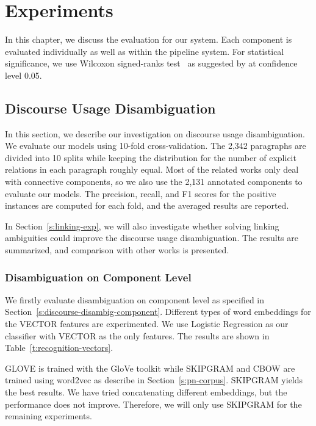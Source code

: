 %
%
%
\chapter{Experiments}
\label{c:exp}

In this chapter, we discuss the evaluation for our system. Each component
is evaluated individually as well as within the pipeline system. For
statistical significance, we use Wilcoxon signed-ranks test~\citep{wilcoxon1945individual}
as suggested by \cite{demvsar2006statistical} at confidence level 0.05.

\section{Discourse Usage Disambiguation}
\label{s:discourse-usage-exp}

In this section, we describe our investigation
on discourse usage disambiguation. We evaluate our models using
10-fold cross-validation. The 2,342 paragraphs are divided  into 10 splits
while keeping the distribution for the number of explicit relations
in each paragraph roughly equal. Most of the related works only
deal with connective components, so we also use the 2,131 annotated
components to evaluate our models.
The precision, recall, and F1 scores for the positive instances are computed
for each fold, and the averaged results are reported.

In Section~\ref{s:linking-exp}, we will also investigate whether solving linking
ambiguities could improve the discourse usage disambiguation. The results
are summarized, and comparison with other works is presented.


\subsection{Disambiguation on Component Level}

We firstly evaluate disambiguation on component level as specified in
Section~\ref{s:discourse-disambig-component}.  
Different types of word embeddings for
the VECTOR features are experimented. We use Logistic Regression
as our classifier with VECTOR as the only features. The results are
shown in Table~\ref{t:recognition-vectors}. 



GLOVE is trained with the GloVe toolkit while SKIPGRAM and CBOW are trained
using word2vec as describe in Section~\ref{s:pn-corpus}. SKIPGRAM yields
the best results. We have tried concatenating different embeddings,
but the performance does not improve. Therefore, we will only use SKIPGRAM
for the remaining experiments.

